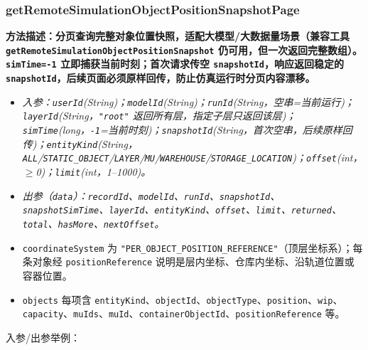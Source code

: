 \subsubsection{getRemoteSimulationObjectPositionSnapshotPage}
\bf{方法描述}：分页查询完整对象位置快照，适配大模型/大数据量场景（兼容工具 \texttt{getRemoteSimulationObjectPositionSnapshot} 仍可用，但一次返回完整数组）。\texttt{simTime=-1} 立即捕获当前时刻；首次请求传空 \texttt{snapshotId}，响应返回稳定的 \texttt{snapshotId}，后续页面\bf{必须原样回传}，防止仿真运行时分页内容漂移。
\begin{itemize}
	\item \it{入参}：\texttt{userId}(String)；\texttt{modelId}(String)；\texttt{runId}(String，空串=当前运行)；\texttt{layerId}(String，\texttt{"root"} 返回所有层，指定子层只返回该层)；\texttt{simTime}(long，\texttt{-1}=当前时刻)；\texttt{snapshotId}(String，首次空串，后续原样回传)；\texttt{entityKind}(String，\texttt{ALL}/\texttt{STATIC\_OBJECT}/\texttt{LAYER}/\texttt{MU}/\texttt{WAREHOUSE}/\texttt{STORAGE\_LOCATION})；\texttt{offset}(int，$\geq$0)；\texttt{limit}(int，1--1000)。
	\item \it{出参}（\texttt{data}）：\texttt{recordId}、\texttt{modelId}、\texttt{runId}、\texttt{snapshotId}、\texttt{snapshotSimTime}、\texttt{layerId}、\texttt{entityKind}、\texttt{offset}、\texttt{limit}、\texttt{returned}、\texttt{total}、\texttt{hasMore}、\texttt{nextOffset}。
	\item \texttt{coordinateSystem} 为 \texttt{"PER\_OBJECT\_POSITION\_REFERENCE"}（顶层坐标系）；每条对象经 \texttt{positionReference} 说明是层内坐标、仓库内坐标、沿轨道位置或容器位置。
	\item \texttt{objects} 每项含 \texttt{entityKind}、\texttt{objectId}、\texttt{objectType}、\texttt{position}、\texttt{wip}、\texttt{capacity}、\texttt{muIds}、\texttt{muId}、\texttt{containerObjectId}、\texttt{positionReference} 等。
\end{itemize}
入参/出参举例：
